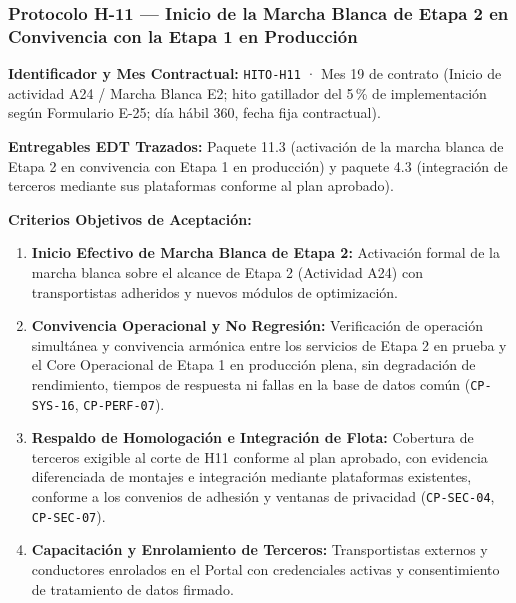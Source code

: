 \subsubsection*{Protocolo H-11 — Inicio de la Marcha Blanca de Etapa 2 en Convivencia con la Etapa 1 en Producción}\label{sec:9-proto-h11}
\par\noindent\textbf{Identificador y Mes Contractual:} \texttt{HITO-H11} · Mes 19 de contrato (Inicio de actividad A24 / Marcha Blanca E2; hito gatillador del 5\,\% de implementación según Formulario E-25; día hábil 360, fecha fija contractual).\par
\par\noindent\textbf{Entregables EDT Trazados:} Paquete 11.3 (activación de la marcha blanca de Etapa 2 en convivencia con Etapa 1 en producción) y paquete 4.3 (integración de terceros mediante sus plataformas conforme al plan aprobado).\par
\par\noindent\textbf{Criterios Objetivos de Aceptación:}
\begin{enumerate}
  \item \textbf{Inicio Efectivo de Marcha Blanca de Etapa 2:} Activación formal de la marcha blanca sobre el alcance de Etapa 2 (Actividad A24) con transportistas adheridos y nuevos módulos de optimización.
  \item \textbf{Convivencia Operacional y No Regresión:} Verificación de operación simultánea y convivencia armónica entre los servicios de Etapa 2 en prueba y el Core Operacional de Etapa 1 en producción plena, sin degradación de rendimiento, tiempos de respuesta ni fallas en la base de datos común (\texttt{CP-SYS-16}, \texttt{CP-PERF-07}).
  \item \textbf{Respaldo de Homologación e Integración de Flota:} Cobertura de terceros exigible al corte de H11 conforme al plan aprobado, con evidencia diferenciada de montajes e integración mediante plataformas existentes, conforme a los convenios de adhesión y ventanas de privacidad (\texttt{CP-SEC-04}, \texttt{CP-SEC-07}).
  \item \textbf{Capacitación y Enrolamiento de Terceros:} Transportistas externos y conductores enrolados en el Portal con credenciales activas y consentimiento de tratamiento de datos firmado.
\end{enumerate}
